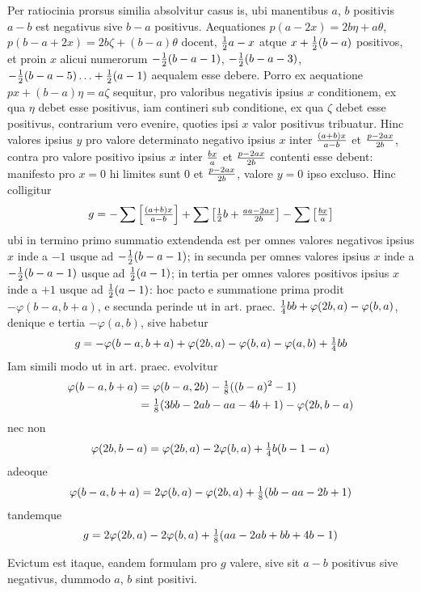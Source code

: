 \documentclass[twoside,12pt]{memoir}
\let\oldfrac\frac
\def\frac#1#2{\mathchoice{\tfrac{#1}{#2}}{\oldfrac{#1}{#2}}{\genfrac{}{}{}{2}{#1}{#2\mathstrut}}{\genfrac{}{}{}{3}{#1}{#2\mathstrut}}}
\begin{document}
Per ratiocinia prorsus similia absolvitur casus is, ubi manentibus \(a\), \( b\) positivis \(a-b\) est negativus sive \(b-a\) positivus. Aequationes \(p(a-2 x)=2 b \eta+a \theta\), \(p(b-a+2 x)=2 b \zeta+(b-a) \theta\) docent, \(\frac{1}{2} a-x\) atque \(x+\frac{1}{2}(b-a)\) positivos, et proin \(x\) alicui numerorum \(-\frac{1}{2}(b-a-1)\), \(-\frac{1}{2}(b-a-3)\), \(-\frac{1}{2}(b-a-5) \ldots+\frac{1}{2}(a-1)\) aequalem esse debere. Porro ex aequatione \(p x+(b-a) \eta=a \zeta\) sequitur, pro valoribus negativis ipsius \(x\) conditionem, ex qua \(\eta\) debet esse positivus, iam contineri sub conditione, ex qua \(\zeta\) debet esse positivus, contrarium vero evenire, quoties ipsi \(x\) valor positivus tribuatur. Hinc valores ipsius \(y\) pro valore determinato negativo ipsius \(x\) inter \(\frac{(a+b) x}{a-b}\) et \(\frac{p-2 a x}{2 b}\), contra pro valore positivo ipsius \(x\) inter \(\frac{b x}{a}\) et \(\frac{p-2 a x}{2 b}\) contenti esse debent: manifesto pro \(x=0\) hi limites sunt \(0\) et \(\frac{p-2 a x}{2 b}\), valore \(y=0\) ipso excluso. Hinc colligitur
\[g=-\sum\left[\frac{(a+b) x}{a-b}\right]+\sum\left[\frac{1}{2} b+\frac{a a-2 a x}{2 b}\right]-\sum\left[\frac{b x}{a}\right]\]
ubi in termino primo summatio extendenda est per omnes valores negativos ipsius \(x\) inde a \(-1\) usque ad \(-\frac{1}{2}(b-a-1)\); in secunda per omnes valores ipsius \(x\) inde a \(-\frac{1}{2}(b-a-1)\) usque ad \(\frac{1}{2}(a-1)\); in tertia per omnes valores positivos ipsius \(x\) inde a \(+1\) usque ad \(\frac{1}{2}(a-1)\): hoc pacto e summatione prima prodit \(-\varphi(b-a, b+a)\), e secunda perinde ut in art. praec. \(\frac{1}{4} b b+\varphi(2 b, a)-\varphi(b, a)\), denique e tertia \(-\varphi(a, b)\), sive habetur
\[g=-\varphi(b-a, b+a)+\varphi(2 b, a)-\varphi(b, a)-\varphi(a, b)+\frac{1}{4} b b\]
Iam simili modo ut in art. praec. evolvitur\pagebreak%
\[\begin{aligned}
\varphi(b-a, b+a) & =\varphi(b-a, 2 b)-\frac{1}{8}((b-a)^{2}-1) \\
& =\frac{1}{8}(3 b b-2 a b-a a-4 b+1)-\varphi(2 b, b-a)
\end{aligned}\]
nec non
\[\varphi(2 b, b-a)=\varphi(2 b, a)-2 \varphi(b, a)+\frac{1}{4} b(b-1-a)\]
adeoque
\[\varphi(b-a, b+a)=2 \varphi(b, a)-\varphi(2 b, a)+\frac{1}{8}(b b-a a-2 b+1)\]
tandemque
\[g=2 \varphi(2 b, a)-2 \varphi(b, a)+\frac{1}{8}(a a-2 a b+b b+4 b-1)\]
 
Evictum est itaque, eandem formulam pro \(g\) valere, sive sit \(a-b\) positivus sive negativus, dummodo \(a\), \(b\) sint positivi.
\end{document}
